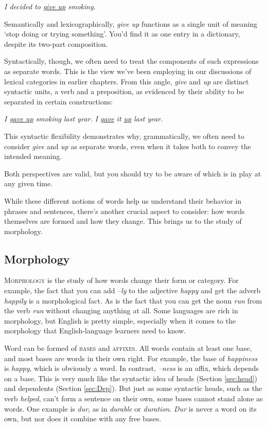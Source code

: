 \ea \textit{I decided to \uline{give up} smoking.}
\z

\noindent Semantically and lexicographically, \textit{give up} functions as a single unit of meaning `stop doing or trying something'. You'd find it as one entry in a dictionary, despite its two-part composition.

Syntactically, though, we often need to treat the components of such expressions as separate words. This is the view we've been employing in our discussions of lexical categories in earlier chapters. From this angle, \textit{give} and \textit{up} are distinct syntactic units, a verb and a preposition, as evidenced by their ability to be separated in certain constructions:

\ea
\ea \textit{I \uline{gave up} smoking last year.}
\ex \textit{I \uline{gave} it \uline{up} last year.}
\z\z

This syntactic flexibility demonstrates why, grammatically, we often need to consider \textit{give} and \textit{up} as separate words, even when it takes both to convey the intended meaning.

Both perspectives are valid, but you should try to be aware of which is in play at any given time.

While these different notions of words help us understand their behavior in phrases and sentences, there's another crucial aspect to consider: how words themselves are formed and how they change. This brings us to the study of morphology.

\subsection{Morphology} \label{sec:morphology}

\textsc{Morphology} is the study of how words change their form or category. For example, the fact that you can add \textit{--ly} to the adjective \textit{happy} and get the adverb \textit{happily} is a morphological fact. As is the fact that you can get the noun \textit{run} from the verb \textit{run} without changing anything at all. Some languages are rich in morphology, but English is pretty simple, especially when it comes to the morphology that English-language learners need to know.

Word can be formed of \textsc{bases} and \textsc{affixes}. All words contain at least one base, and most bases are words in their own right. For example, the base of \textit{happiness} is \textit{happy}, which is obviously a word. In contrast, \textit{--ness} is an affix, which depends on a base. This is very much like the syntactic idea of heads (Section \ref{sec:head}) and dependents (Section \ref{sec:Dep}). But just as some syntactic heads, such as the verb \textit{helped}, can't form a sentence on their own, some bases cannot stand alone as words. One example is \textit{dur}, as in \textit{durable} or \textit{duration}. \textit{Dur} is never a word on its own, but nor does it combine with any free bases.


